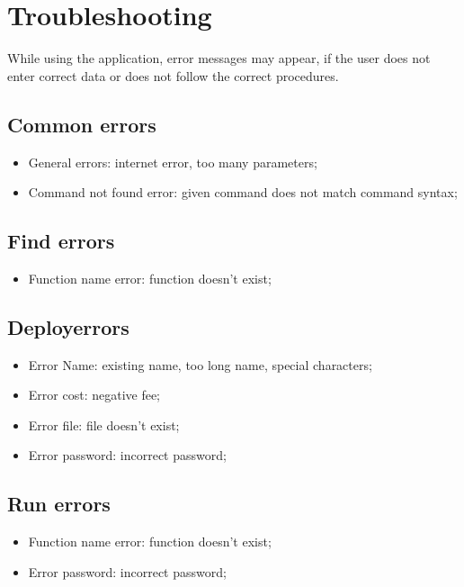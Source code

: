 \section{Troubleshooting}
While using the application, error messages may appear, if the user does not enter correct data or does not follow the correct procedures. 
\subsection{Common errors}
\begin{itemize}
	\item General errors: internet error, too many parameters;
	\item Command not found error: given command does not match command syntax;
\end{itemize}
\subsection{Find errors}
\begin{itemize}
	\item Function name error: function doesn't exist;
\end{itemize}
\subsection{Deploy\glo errors}
\begin{itemize}
	\item Error Name: existing name, too long name, special characters;
	\item Error cost: negative fee;
	\item Error file: file doesn't exist;
	\item Error password: incorrect password;
\end{itemize}
\subsection{Run errors}
\begin{itemize}
	\item Function name error: function doesn't exist;
	\item Error password: incorrect password;
\end{itemize}
